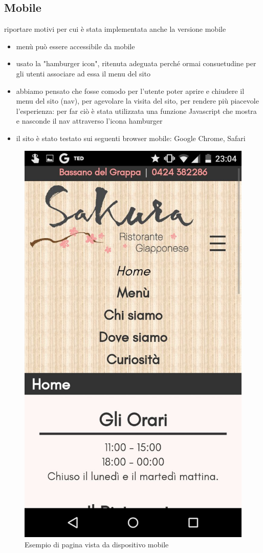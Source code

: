 \documentclass[../relazione.tex]{subfiles}
\begin{document}
	\subsection{Mobile}
	riportare motivi per cui è stata implementata anche la versione mobile
	\begin{itemize}
		\item menù può essere accessibile da mobile
		\item usato la "hamburger icon", ritenuta adeguata perché ormai consuetudine per gli utenti associare ad essa il menu del sito
		\item abbiamo pensato che fosse comodo per l'utente poter aprire e chiudere il menu del sito (nav), per agevolare la visita del sito, per rendere più piacevole l'esperienza: per far ciò è stata utilizzata una funzione Javascript che mostra e nasconde il nav attraverso l'icona hamburger
		\item il sito è stato testato sui seguenti browser mobile: Google Chrome, Safari
	\end{itemize}
	\begin{figure}[H]
		\centering
		\includegraphics[scale=0.2]{images/mobile2}
		\caption{Esempio di pagina vista da dispositivo mobile}
		\label{fig:Esempio di pagina vista da dispositivo mobile}
	\end{figure}
\end{document}
